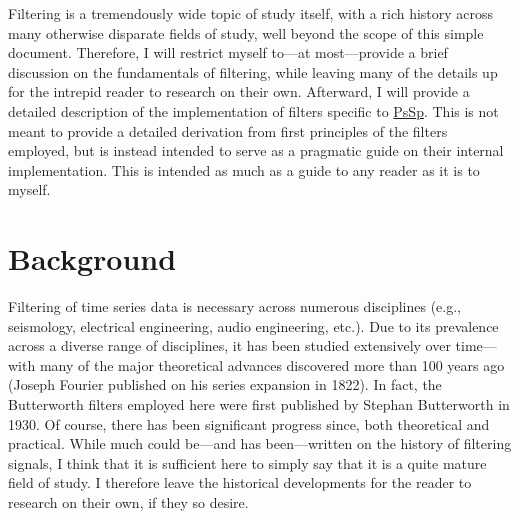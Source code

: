 \documentclass[american, twoside]{article}
\begin{document}
Filtering is a tremendously wide topic of study itself, with a rich history across many otherwise disparate fields of study, well
beyond the scope of this simple document. Therefore, I will restrict myself to---at most---provide a brief discussion
on the fundamentals of filtering, while leaving many of the details up for the intrepid reader to research on their own. Afterward,
I will provide a detailed description of the implementation of filters specific to \href{https://github.com/arbCoding/PsSp}{PsSp}.
This is not meant to provide a detailed derivation from first principles of the filters employed, but is instead intended to serve as
a pragmatic guide on their internal implementation. This is intended as much as a guide to any reader as it is to myself.

\section{Background} \label{Background}
Filtering of time series data is necessary across numerous disciplines (e.g., seismology, electrical engineering, audio engineering, etc.). Due to its prevalence
across a diverse range of disciplines, it has been studied extensively over time---with many of the major theoretical advances discovered
more than 100 years ago (Joseph Fourier published on his series expansion in 1822\autocite{fourier1822theorie}). In fact, the Butterworth filters employed here were first published
by Stephan Butterworth in 1930\autocite{butterworth1930theory}. Of course, there has been significant progress since, both theoretical and practical. While much could be---and has been---written
on the history of filtering signals, I think that it is sufficient here to simply say that it is a quite mature field of study. I therefore leave the historical developments
for the reader to research on their own, if they so desire.

\end{document}

